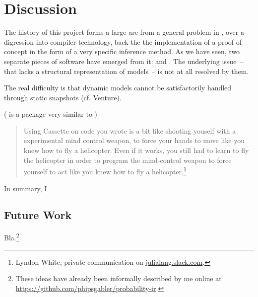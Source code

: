 \chapter{Discussion}
\label{cha:discussion}

The history of this project forms a large arc from a general problem in \turingjl{}, over a
digression into compiler technology, back the the implementation of a proof of concept in the form
of a very specific inference method.  As we have seen, two separate pieces of software have emerged
from it: \irtrackerjl{} and \autogibbsjl{}.  The underlying issue~-- that \turingjl{} lacks a
structural representation of models~-- is not at all resolved by them.

The real difficulty is that dynamic models cannot be satisfactorily handled through static snapshots
(cf. Venture).

( is a package very similar to )
\begin{quote}
  Using Cassette on code you wrote is a bit like shooting youself with a experimental mind control
  weapon, to force your hands to move like you knew how to fly a helicopter. Even if it works, you
  still had to learn to fly the helicopter in order to program the mind-control weapon to force
  yourself to act like you knew how to fly a helicopter.\footnote{Lyndon White, private
    communication on \protect\url{julialang.slack.com}.}
\end{quote}

In summary, I 

\section{Future Work}
\label{sec:future-work}

Bla.\footnote{These ideas have already been informally described by me online at
  \protect\url{https://github.com/phipsgabler/probability-ir}.}




